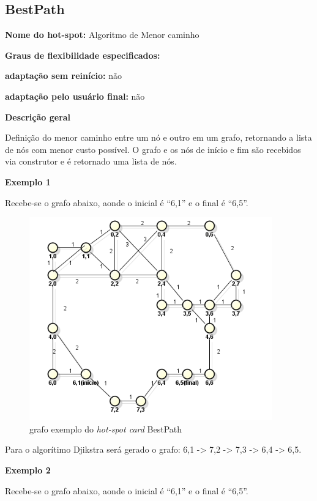 \begin{anexosenv}
\section{BestPath}

{\large \textbf{Nome do hot-spot:}} Algoritmo de Menor caminho

{\large \textbf{Graus de flexibilidade especificados:}}

\textbf{adaptação sem reinício:} não

\textbf{adaptação pelo usuário final:} não

{\large \textbf{Descrição geral}}

Definição do menor caminho entre um nó e outro em um grafo, retornando a lista de nós com menor custo possível. O grafo e os nós de início e fim são recebidos via construtor e é retornado uma lista de nós.

{\large \textbf{Exemplo 1}}

Recebe-se o grafo abaixo, aonde o inicial é “6,1” e o final é “6,5”.

\begin{figure}[h]
	\centering
	\label{figXX}
		\includegraphics[keepaspectratio=true,scale=0.7]{figuras/grafohotspotcard1.PNG}
	\caption{grafo exemplo do \textit{hot-spot card} BestPath}
\end{figure}

Para o algorítimo Djikstra será gerado o grafo: 6,1 -> 7,2 -> 7,3 -> 6,4 -> 6,5.

{\large \textbf{Exemplo 2}}

Recebe-se o grafo abaixo, aonde o inicial é “6,1” e o final é “6,5”.


\end{anexosenv}
